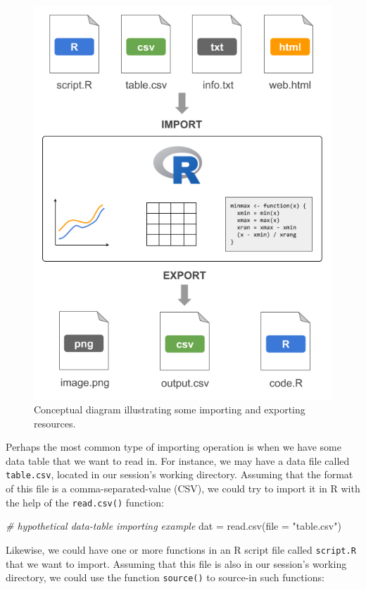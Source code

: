 \documentclass[
]{book}
\newenvironment{Shaded}{\begin{snugshade}}{\end{snugshade}}
\newcommand{\AttributeTok}[1]{\textcolor[rgb]{0.77,0.63,0.00}{#1}}
\newcommand{\CommentTok}[1]{\textcolor[rgb]{0.56,0.35,0.01}{\textit{#1}}}
\newcommand{\FunctionTok}[1]{\textcolor[rgb]{0.00,0.00,0.00}{#1}}
\newcommand{\NormalTok}[1]{#1}
\newcommand{\OtherTok}[1]{\textcolor[rgb]{0.56,0.35,0.01}{#1}}
\newcommand{\StringTok}[1]{\textcolor[rgb]{0.31,0.60,0.02}{#1}}
\begin{document}
\begin{figure}

{\centering \includegraphics[width=0.6\linewidth]{images/inout/import-export-resources} 

}

\caption{Conceptual diagram illustrating some importing and exporting resources.}\label{fig:unnamed-chunk-358}
\end{figure}

Perhaps the most common type of importing operation is when we have some data
table that we want to read in. For instance, we may have a data file called
\texttt{table.csv}, located in our session's working directory. Assuming that the
format of this file is a comma-separated-value (CSV), we could try to import
it in R with the help of the \texttt{read.csv()} function:

\begin{Shaded}
\begin{Highlighting}[]
\CommentTok{\# hypothetical data{-}table importing example}
\NormalTok{dat }\OtherTok{=} \FunctionTok{read.csv}\NormalTok{(}\AttributeTok{file =} \StringTok{"table.csv"}\NormalTok{)}
\end{Highlighting}
\end{Shaded}

Likewise, we could have one or more functions in an R script file called
\texttt{script.R} that we want to import. Assuming that this file is also in our
session's working directory, we could use the function \texttt{source()} to source-in
such functions:
\end{document}
